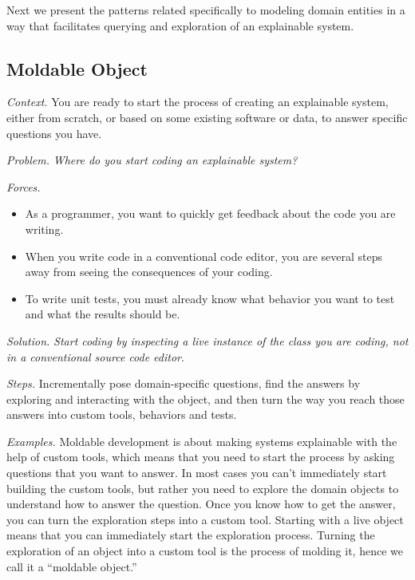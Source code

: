 \documentclass[sigconf,screen]{acmart}
\newcommand\cp[1]{\nbe{Cesare}{#1}{olive}} %
\newcommand\ws[1]{\nbe{Workshop}{#1}{teal}} %
\newcommand{\pattern}[2]{\needlines{10}
\subsection*{#1}\label{pat:#2}}
\newcommand{\patsec}[1]{\noindent\textit{#1.}\xspace}
\begin{document}
Next we present the patterns related specifically to modeling domain entities in a way that facilitates querying and exploration of an explainable system.

\pattern{Moldable Object}{MoldableObject}


\patsec{Context}
You are ready to start the process of creating an explainable system, either from scratch, or based on some existing software or data, to answer specific questions you have.

\patsec{Problem}
\emph{Where do you start coding an explainable system?}

\patsec{Forces}
\begin{itemize}[---]
\item As a programmer, you want to quickly get feedback about the code you are writing.
\item When you write code in a conventional code editor, you are several steps away from seeing the consequences of your coding.
\item To write unit tests, you must already know what behavior you want to test and what the results should be.
\end{itemize}

\patsec{Solution}
\emph{Start coding by inspecting a live instance of the class you are coding, not in a conventional source code editor}.

\patsec{Steps}
Incrementally pose domain-specific questions, find the answers by exploring and interacting with the object, and then turn the way you reach those answers into custom tools, behaviors and tests.

\patsec{Examples}
Moldable development is about making systems explainable with the help of custom tools, which means that you need to start the process by asking questions that you want to answer.
In most cases you can't immediately start building the custom tools, but rather you need to explore the domain objects to understand how to answer the question.
Once you know how to get the answer, you can turn the exploration steps into a custom tool.
Starting with a live object means that you can immediately start the exploration process.
Turning the exploration of an object into a custom tool is the process of molding it, hence we call it a ``moldable object.''
\end{document}
